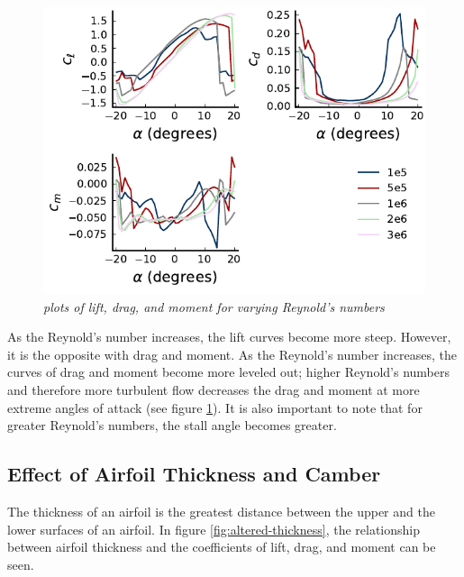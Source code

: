 \documentclass{journal}
\begin{document}
	\begin{figure}
		\centering
		\includegraphics{../graphics/altered-reynolds.pdf}
		\caption{\emph{plots of lift, drag, and moment for varying Reynold's numbers}}
		\label{fig:altered-reynolds}
	\end{figure}
	
	As the Reynold's number increases, the lift curves become more steep. However, it is the opposite with drag and moment. As the Reynold's number increases, the curves of drag and moment become more leveled out; higher Reynold's numbers and therefore more turbulent flow decreases the drag and moment at more extreme angles of attack (see figure \ref{fig:altered-reynolds}). It is also important to note that for greater Reynold's numbers, the stall angle becomes greater.
		
	\subsection{Effect of Airfoil Thickness and Camber}
	The thickness of an airfoil is the greatest distance between the upper and the lower surfaces of an airfoil. In figure \ref{fig:altered-thickness}, the relationship between airfoil thickness and the coefficients of lift, drag, and moment can be seen.
	
\end{document}
